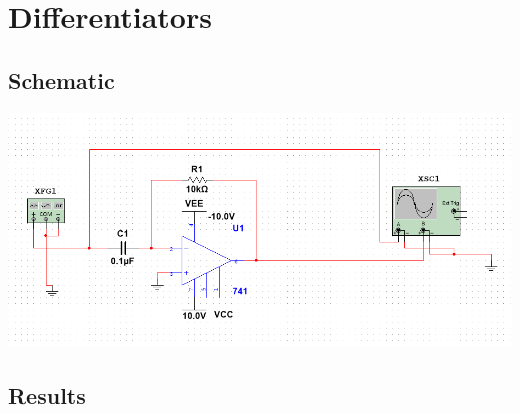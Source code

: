 \documentclass[a4paper, 12pt, english]{article}
\newenvironment{Figure}
  {\par\medskip\noindent\minipage{\linewidth}}
  {\endminipage\par\medskip}
\begin{document}
\newpage
\section{Differentiators}
\subsection{Schematic}
\begin{Figure}
 \centering
 \includegraphics[width=1.2\linewidth, scale=2]{images/diff circuit.png}
\end{Figure}


\subsection{Results}
\end{document}
